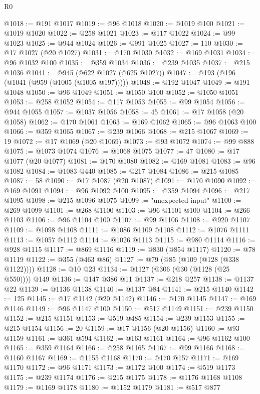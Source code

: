 \begin{lexlean}{R0}
\begin{coremodule}
@1018 := @191 @1017
@1019 := @96 @1018
@1020 := @1019 @100
@1021 := @1019 @1020
@1022 := @258 @1021
@1023 := @117 @1022
@1024 := @99 @1023
@1025 := @944 @1024
@1026 := @991 @1025
@1027 := 110
@1030 := @17 @1027 (@20 @1027)
@1031 := @170 @1030
@1032 := @169 @1031
@1034 := @96 @1032 @100
@1035 := @359 @1034
@1036 := @239 @1035
@1037 := @215 @1036
@1041 := @945 (@622 @1027 (@625 @1027))
@1047 := @193 (@196 (@1041 (@959 (@1005 (@1005 @197)))))
@1048 := @192 @1047
@1049 := @191 @1048
@1050 := @96 @1049
@1051 := @1050 @100
@1052 := @1050 @1051
@1053 := @258 @1052
@1054 := @117 @1053
@1055 := @99 @1054
@1056 := @944 @1055
@1057 := @1037 @1056
@1058 := 45
@1061 := @17 @1058 (@20 @1058)
@1062 := @170 @1061
@1063 := @169 @1062
@1065 := @96 @1063 @100
@1066 := @359 @1065
@1067 := @239 @1066
@1068 := @215 @1067
@1069 := 19
@1072 := @17 @1069 (@20 @1069)
@1073 := @93 @1072
@1074 := @99 @888
@1075 := @1073 @1074
@1076 := @1068 @1075
@1077 := 47
@1080 := @17 @1077 (@20 @1077)
@1081 := @170 @1080
@1082 := @169 @1081
@1083 := @96 @1082
@1084 := @1083 @440
@1085 := @217 @1084
@1086 := @215 @1085
@1087 := 58
@1090 := @17 @1087 (@20 @1087)
@1091 := @170 @1090
@1092 := @169 @1091
@1094 := @96 @1092 @100
@1095 := @359 @1094
@1096 := @217 @1095
@1098 := @215 @1096 @1075
@1099 := "unexpected input"
@1100 := @269 @1099
@1101 := @268 @1100
@1103 := @96 @1101 @100
@1104 := @266 @1103
@1106 := @96 @1104 @100
@1107 := @99 @1106
@1108 := @920 @1107
@1109 := @1098 @1108
@1111 := @1086 @1109 @1108
@1112 := @1076 @1111
@1113 := @1057 @1112
@1114 := @1026 @1113
@1115 := @980 @1114
@1116 := @928 @1115
@1117 := @869 @1116
@1119 := @830 (@854 @1117)
@1120 := @78 @1119
@1122 := @355 (@463 @86)
@1127 := @79 (@85 (@109 (@128 (@338 @1122))))
@1128 := @10 @23
@1134 := @1127 (@306 (@30 (@1128 (@25 @550)))) @149
@1136 := @147 @386 @11
@1137 := @218 @257
@1138 := @1137 @22
@1139 := @1136 @1138
@1140 := @1137 @84
@1141 := @215 @1140
@1142 := 125
@1145 := @17 @1142 (@20 @1142)
@1146 := @170 @1145
@1147 := @169 @1146
@1149 := @96 @1147 @100
@1150 := @517 @1149
@1151 := @239 @1150
@1152 := @215 @1151
@1153 := @519 @485
@1154 := @239 @1153
@1155 := @215 @1154
@1156 := 20
@1159 := @17 @1156 (@20 @1156)
@1160 := @93 @1159
@1161 := @361 @594
@1162 := @163 @1161
@1164 := @96 @1162 @100
@1165 := @359 @1164
@1166 := @258 @1165
@1167 := @99 @1166
@1168 := @1160 @1167
@1169 := @1155 @1168
@1170 := @170 @157
@1171 := @169 @1170
@1172 := @96 @1171
@1173 := @1172 @100
@1174 := @519 @1173
@1175 := @239 @1174
@1176 := @215 @1175
@1178 := @1176 @1168 @1108
@1179 := @1169 @1178
@1180 := @1152 @1179
@1181 := @517 @877

\end{coremodule}
\end{lexlean}
